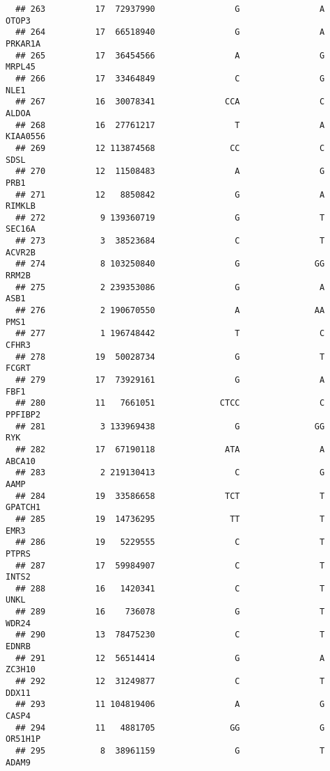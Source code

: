 \documentclass[12pt,twoside]{reedthesis}
\theoremstyle{definition}
\theoremstyle{definition}
\theoremstyle{remark}
\begin{document}
\begin{verbatim}
  ## 263          17  72937990                G                A          OTOP3
  ## 264          17  66518940                G                A        PRKAR1A
  ## 265          17  36454566                A                G         MRPL45
  ## 266          17  33464849                C                G           NLE1
  ## 267          16  30078341              CCA                C          ALDOA
  ## 268          16  27761217                T                A       KIAA0556
  ## 269          12 113874568               CC                C           SDSL
  ## 270          12  11508483                A                G           PRB1
  ## 271          12   8850842                G                A         RIMKLB
  ## 272           9 139360719                G                T         SEC16A
  ## 273           3  38523684                C                T         ACVR2B
  ## 274           8 103250840                G               GG          RRM2B
  ## 275           2 239353086                G                A           ASB1
  ## 276           2 190670550                A               AA           PMS1
  ## 277           1 196748442                T                C          CFHR3
  ## 278          19  50028734                G                T          FCGRT
  ## 279          17  73929161                G                A           FBF1
  ## 280          11   7661051             CTCC                C        PPFIBP2
  ## 281           3 133969438                G               GG            RYK
  ## 282          17  67190118              ATA                A         ABCA10
  ## 283           2 219130413                C                G           AAMP
  ## 284          19  33586658              TCT                T        GPATCH1
  ## 285          19  14736295               TT                T           EMR3
  ## 286          19   5229555                C                T          PTPRS
  ## 287          17  59984907                C                T          INTS2
  ## 288          16   1420341                C                T           UNKL
  ## 289          16    736078                G                T          WDR24
  ## 290          13  78475230                C                T          EDNRB
  ## 291          12  56514414                G                A         ZC3H10
  ## 292          12  31249877                C                T          DDX11
  ## 293          11 104819406                A                G          CASP4
  ## 294          11   4881705               GG                G        OR51H1P
  ## 295           8  38961159                G                T          ADAM9

\end{verbatim}
\end{document}
